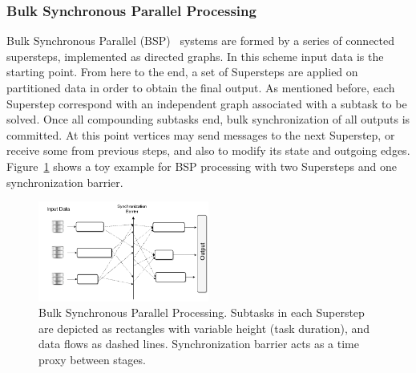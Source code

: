 \documentclass[3p,review]{elsarticle}
\begin{document}

\subsubsection{Bulk Synchronous Parallel Processing}

Bulk Synchronous Parallel (BSP)~\cite{vali90} systems are formed by a series of connected supersteps, implemented as directed graphs. In this scheme input data is the starting point. From here to the end, a set of Supersteps are applied on partitioned data in order to obtain the final output. As mentioned before, each Superstep correspond with an independent graph associated with a subtask to be solved. Once all compounding subtasks end, bulk synchronization of all outputs is committed. At this point vertices may send messages to the next Superstep, or receive some from previous steps, and also to modify its state and outgoing edges. Figure~\ref{fig:bsp} shows a toy example for BSP processing with two Supersteps and one synchronization barrier.

\begin{figure}[htp]
    \centering
    \includegraphics[width=0.5\textwidth]{bsp}
    \caption{Bulk Synchronous Parallel Processing. Subtasks in each Superstep are depicted as rectangles with variable height (task duration), and data flows as dashed lines. Synchronization barrier acts as a time proxy between stages.}
    \label{fig:bsp}
\end{figure}
\end{document}
